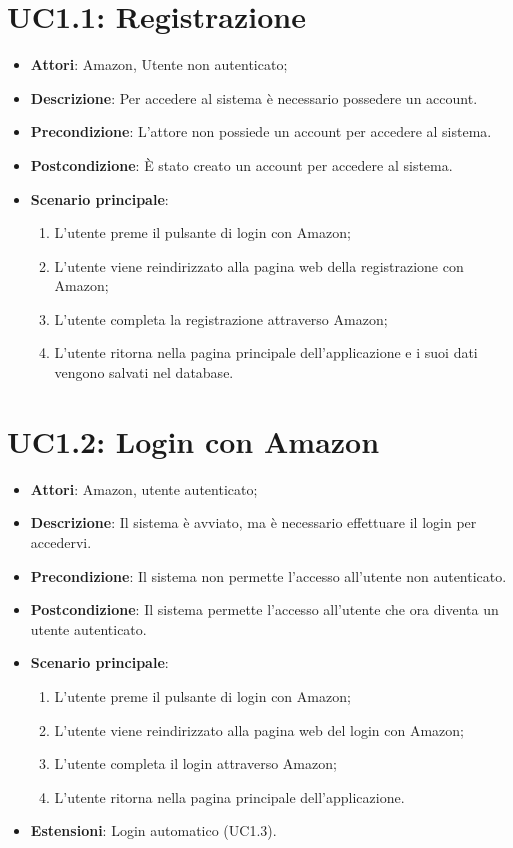 \section{UC1.1: Registrazione}
\label{UC1.1}
\begin{itemize}
	\item \textbf{Attori}: Amazon, Utente non autenticato;
	\item \textbf{Descrizione}: Per accedere al sistema è necessario possedere un account.
	\item \textbf{Precondizione}: L'attore non possiede un account per accedere al sistema.
	\item \textbf{Postcondizione}: \`E stato creato un account per accedere al sistema.
	\item \textbf{Scenario principale}:
	\begin{enumerate} \item L'utente preme il pulsante di login con Amazon;  \item  L'utente viene reindirizzato alla pagina web della registrazione con Amazon;  \item L'utente completa la registrazione attraverso Amazon;  \item  L'utente ritorna nella pagina principale dell'applicazione e i suoi dati vengono salvati nel database.\end{enumerate}
\end{itemize}

\section{UC1.2: Login con Amazon}
\label{UC1.2}
\begin{itemize}
	\item \textbf{Attori}: Amazon, utente autenticato;
	\item \textbf{Descrizione}: Il sistema è avviato, ma è necessario effettuare il login per accedervi.
	\item \textbf{Precondizione}: Il sistema non permette l'accesso all'utente non autenticato.
	\item \textbf{Postcondizione}: Il sistema permette l'accesso all'utente che ora diventa un utente autenticato.
	\item \textbf{Scenario principale}:
	\begin{enumerate} \item L'utente preme il pulsante di login con Amazon;  \item  L'utente viene reindirizzato alla pagina web del login con Amazon;  \item L'utente completa il login attraverso Amazon;  \item  L'utente ritorna nella pagina principale dell'applicazione.\end{enumerate}
	\item \textbf{Estensioni}:
	Login automatico (UC1.3).
\end{itemize}

